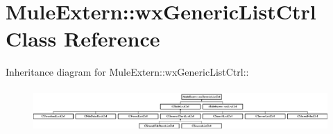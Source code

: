 \section{MuleExtern::wxGenericListCtrl Class Reference}
\label{classMuleExtern_1_1wxGenericListCtrl}
Inheritance diagram for MuleExtern::wxGenericListCtrl::\begin{figure}[H]
\begin{center}
\leavevmode
\includegraphics[height=1.69312cm]{classMuleExtern_1_1wxGenericListCtrl}
\end{center}
\end{figure}
